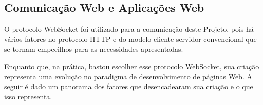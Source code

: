 \documentclass[a4paper,12pt]{article}
\begin{document}






\newpage
\subsection{Comunicação Web e Aplicações Web}


O protocolo WebSocket foi utilizado para a comunicação deste Projeto, pois há vários fatores no protocolo HTTP e do modelo cliente-servidor convencional que se tornam empecilhos para as necessidades apresentadas.

Enquanto que, na prática, bastou escolher esse protocolo WebSocket, sua criação representa uma evolução no paradigma de desenvolvimento de páginas Web. A seguir é dado um panorama dos fatores que desencadearam sua criação e o que isso representa.
\end{document}
